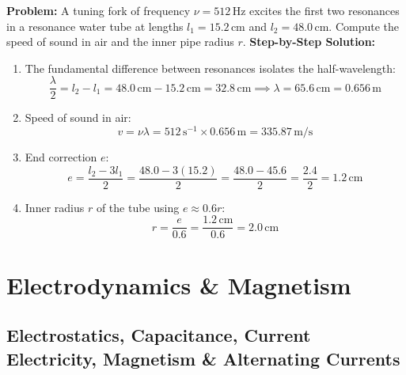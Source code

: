 \documentclass[10pt,twoside,openright]{book}
\begin{document}
\begin{usecasebox}
\textbf{Problem:} A tuning fork of frequency $\nu = 512\,\mathrm{Hz}$ excites the first two resonances in a resonance water tube at lengths $l_1 = 15.2\,\mathrm{cm}$ and $l_2 = 48.0\,\mathrm{cm}$. Compute the speed of sound in air and the inner pipe radius $r$.
\textbf{Step-by-Step Solution:}
\begin{enumerate}
  \item The fundamental difference between resonances isolates the half-wavelength:
  \begin{equation}
    \frac{\lambda}{2} = l_2 - l_1 = 48.0\,\mathrm{cm} - 15.2\,\mathrm{cm} = 32.8\,\mathrm{cm} \implies \lambda = 65.6\,\mathrm{cm} = 0.656\,\mathrm{m}
  \end{equation}
  \item Speed of sound in air:
  \begin{equation}
    v = \nu \lambda = 512\,\mathrm{s}^{-1} \times 0.656\,\mathrm{m} = \mathbf{335.87\,\mathrm{m/s}}
  \end{equation}
  \item End correction $e$:
  \begin{equation}
    e = \frac{l_2 - 3l_1}{2} = \frac{48.0 - 3(15.2)}{2} = \frac{48.0 - 45.6}{2} = \frac{2.4}{2} = \mathbf{1.2\,\mathrm{cm}}
  \end{equation}
  \item Inner radius $r$ of the tube using $e \approx 0.6 r$:
  \begin{equation}
    r = \frac{e}{0.6} = \frac{1.2\,\mathrm{cm}}{0.6} = \mathbf{2.0\,\mathrm{cm}}
  \end{equation}
\end{enumerate}
\end{usecasebox}

\part{Electrodynamics \& Magnetism}

\chapter{Electrostatics, Capacitance, Current Electricity, Magnetism \& Alternating Currents}
\end{document}
